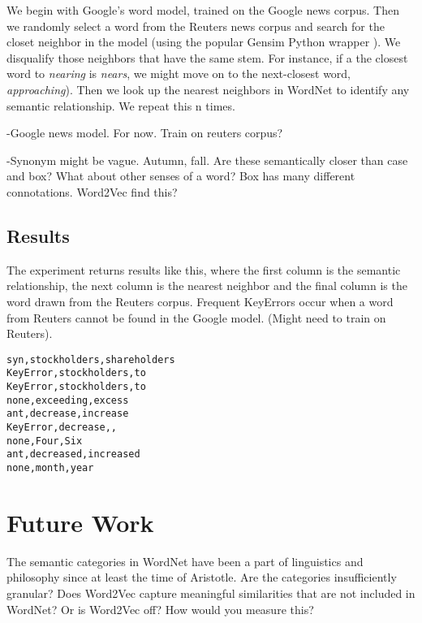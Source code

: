 \documentclass{article}
\begin{document}
We begin with Google's word model, trained on the Google news corpus. Then we randomly select a word from the Reuters news corpus and search for the closet neighbor in the model (using the popular Gensim Python wrapper \cite{gensim}). We disqualify those neighbors that have the same stem. For instance, if a the closest word to \textit{nearing} is \textit{nears}, we might move on to the next-closest word, \textit{approaching}). Then we look up the nearest neighbors in WordNet to identify any semantic relationship. We repeat this n times. 

-Google news model. For now. Train on reuters corpus? 

-Synonym might be vague. Autumn, fall. Are these semantically closer than case and box? What about other senses of a word?  Box has many different connotations. Word2Vec find this? 


\subsection{Results}
The experiment returns results like this, where the first column is the semantic relationship, the next column is the nearest neighbor and the final column is the word drawn from the Reuters corpus. Frequent KeyErrors occur when a word from Reuters cannot be found in the Google model. (Might need to train on Reuters). 

\begin{lstlisting}
syn,stockholders,shareholders
KeyError,stockholders,to
KeyError,stockholders,to
none,exceeding,excess
ant,decrease,increase
KeyError,decrease,,
none,Four,Six
ant,decreased,increased
none,month,year
\end{lstlisting}

\section{Future Work}
The semantic categories in WordNet have been a part of linguistics and philosophy since at least the time of Aristotle. Are the categories insufficiently granular? Does Word2Vec capture meaningful similarities that are not included in WordNet? Or is Word2Vec off? How would you measure this? 


\end{document}
